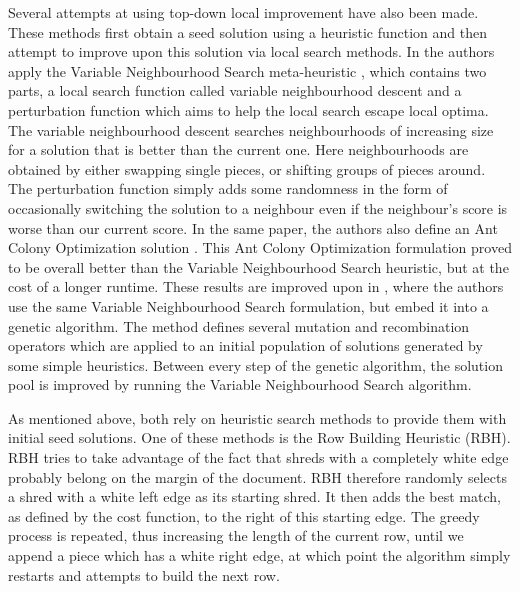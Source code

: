 Several attempts at using top-down local improvement have also been made. These methods first obtain a seed solution using a heuristic function and then attempt to improve upon this solution via local search methods. In \cite{P5} the authors apply the Variable Neighbourhood Search meta-heuristic \cite{P38}, which contains two parts, a local search function called variable neighbourhood descent and a perturbation function which aims to help the local search escape local optima. The variable neighbourhood descent searches neighbourhoods of increasing size for a solution that is better than the current one. Here neighbourhoods are obtained by either swapping single pieces, or shifting groups of pieces around. The perturbation function simply adds some randomness in the form of occasionally switching the solution to a neighbour even if the neighbour's score is worse than our current score. In the same paper, the authors also define an Ant Colony Optimization solution \cite{P39}. This Ant Colony Optimization formulation proved to be overall better than the Variable Neighbourhood Search heuristic, but at the cost of a longer runtime. These results are improved upon in \cite{P7}, where the authors use the same Variable Neighbourhood Search formulation, but embed it into a genetic algorithm. The method defines several mutation and recombination operators which are applied to an initial population of solutions generated by some simple heuristics. Between every step of the genetic algorithm, the solution pool is improved by running the Variable Neighbourhood Search algorithm.

As mentioned above, \cite{P5,P7} both rely on heuristic search methods to provide them with initial seed solutions. One of these methods is the Row Building Heuristic (RBH). RBH tries to take advantage of the fact that shreds with a completely white edge probably belong on the margin of the document. RBH therefore randomly selects a shred with a white left edge as its starting shred. It then adds the best match, as defined by the cost function, to the right of this starting edge. The greedy process is repeated, thus increasing the length of the current row, until we append a piece which has a white right edge, at which point the algorithm simply restarts and attempts to build the next row. 

